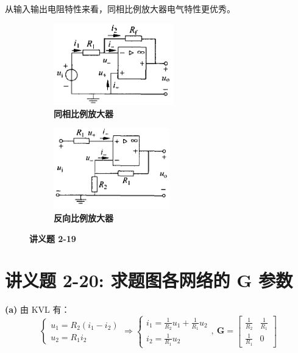 \documentclass[UTF8]{report}
\theoremstyle{MyLineTheoremStyle} %
\theoremstyle{MyBlockTheoremStyle} %
\theoremstyle{MySubsubsectionStyle} %
\begin{document}
从输入输出电阻特性来看，同相比例放大器电气特性更优秀。

\begin{figure}[H]\centering
\begin{subfigure}[t]{0.4\textwidth}\centering
    \includegraphics[height=100pt]{assets/3/反向比例放大器.png}
    \caption{\bfseries 同相比例放大器}
\end{subfigure}\begin{subfigure}[t]{0.4\textwidth}\centering
    \includegraphics[height=100pt]{assets/3/同相比例放大器.png}
    \caption{\bfseries 反向比例放大器}
\end{subfigure}
\caption{\bfseries 讲义题 2-19}
\end{figure}

\section{讲义题 2-20: 求题图各网络的 $\boldsymbol{G}$ 参数}
\textbf{(a)} 由 KVL 有：
\begin{equation}
\begin{cases}
    u_1 = R_2(i_1 - i_2) \\
    u_2 = R_1 i_2 
\end{cases}\Longrightarrow  
\begin{cases}
    i_1 = \frac{1}{R_2}u_1 + \frac{1}{R_1}u_2 \\ 
    i_2 = \frac{1}{R_1}u_2 
\end{cases},\ 
\boldsymbol{G} = 
\begin{bmatrix}
    \frac{1}{R_2} & \frac{1}{R_1} \\ 
    \frac{1}{R_1} & 0
\end{bmatrix}
\end{equation}
\end{document}
